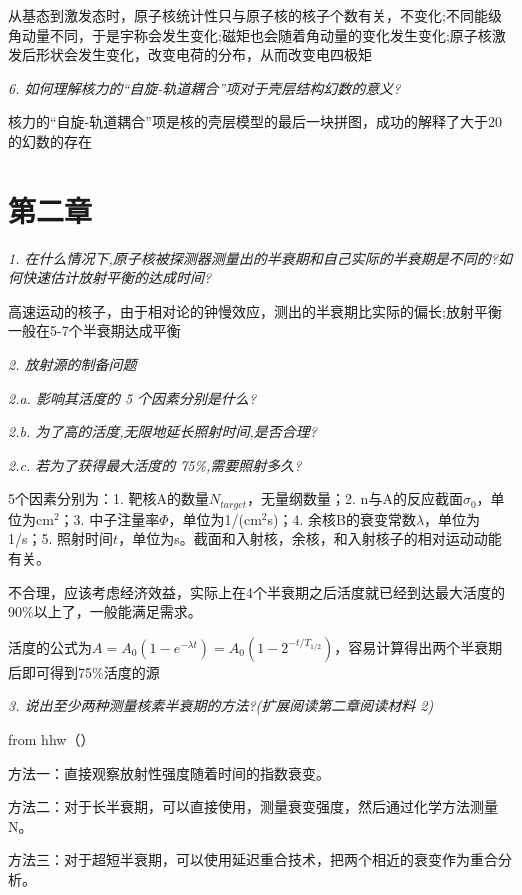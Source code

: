 \documentclass{article}
\begin{document}
从基态到激发态时，原子核统计性只与原子核的核子个数有关，不变化;不同能级角动量不同，于是宇称会发生变化;磁矩也会随着角动量的变化发生变化;原子核激发后形状会发生变化，改变电荷的分布，从而改变电四极矩

\emph{}

\emph{6. 如何理解核力的“自旋-轨道耦合”项对于壳层结构幻数的意义?}

核力的“自旋-轨道耦合”项是核的壳层模型的最后一块拼图，成功的解释了大于20的幻数的存在

\emph{}

\section*{第二章}

\emph{1. 在什么情况下,原子核被探测器测量出的半衰期和自己实际的半衰期是不同的?如何快速估计放射平衡的达成时间?}

高速运动的核子，由于相对论的钟慢效应，测出的半衰期比实际的偏长;放射平衡一般在5-7个半衰期达成平衡

\emph{}

\emph{2. 放射源的制备问题}

\emph{ 2.a. 影响其活度的 5 个因素分别是什么?}

\emph{ 2.b. 为了高的活度,无限地延长照射时间,是否合理?}

\emph{ 2.c. 若为了获得最大活度的 75\%,需要照射多久?}

5个因素分别为：1. 靶核A的数量$N_{target}$，无量纲数量；2. n与A的反应截面$\sigma_0$，单位为cm$^2$；3. 中子注量率$\Phi$，单位为1/(cm$^2$s)；4. 余核B的衰变常数$\lambda$，单位为1/s；5. 照射时间$t$，单位为s。截面和入射核，余核，和入射核子的相对运动动能有关。

不合理，应该考虑经济效益，实际上在4个半衰期之后活度就已经到达最大活度的90\%以上了，一般能满足需求。

活度的公式为$A=A_0(1-e^{-\lambda t})=A_0(1-2^{-t/T_{1/2}})$，容易计算得出两个半衰期后即可得到75\%活度的源

\emph{}

\emph{3. 说出至少两种测量核素半衰期的方法?(扩展阅读第二章阅读材料 2)}

from hhw（）

方法一：直接观察放射性强度随着时间的指数衰变。

方法二：对于长半衰期，可以直接使用，测量衰变强度，然后通过化学方法测量N。

方法三：对于超短半衰期，可以使用延迟重合技术，把两个相近的衰变作为重合分析。

\emph{}
\end{document}
